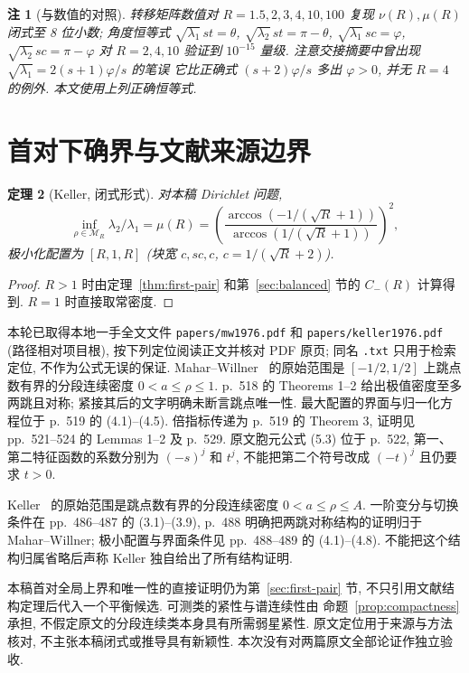 \documentclass[UTF8]{ctexart}
\newtheorem{theorem}{定理}[section]
\newtheorem{remark}[theorem]{注}
\begin{document}
\begin{remark}[与数值的对照]
转移矩阵数值对 $R = 1.5, 2, 3, 4, 10, 100$ 复现 $\nu(R), \mu(R)$ 闭式至 8 位小数;
角度恒等式 $\sqrt{\lambda_1}\,st = \theta$, $\sqrt{\lambda_2}\,st = \pi-\theta$,
$\sqrt{\lambda_1}\,sc = \varphi$, $\sqrt{\lambda_2}\,sc = \pi-\varphi$ 对 $R = 2, 4, 10$
验证到 $10^{-15}$ 量级. 注意交接摘要中曾出现 $\sqrt{\lambda_1} = 2(s+1)\varphi/s$ 的笔误
它比正确式 $(s+2)\varphi/s$ 多出 $\varphi>0$, 并无 $R=4$ 的例外.
本文使用上列正确恒等式.
\end{remark}

\section{首对下确界与文献来源边界}

\begin{theorem}[Keller, 闭式形式]
对本稿 Dirichlet 问题,
\[
 \inf_{\rho\in\mathcal M_R}\lambda_2/\lambda_1=\mu(R)
 =\left(\frac{\arccos(-1/(\sqrt R+1))}{\arccos(1/(\sqrt R+1))}\right)^2,
\]
极小化配置为 $[R, 1, R]$ (块宽 $c, sc, c$, $c = 1/(\sqrt{R}+2)$).
\end{theorem}

\begin{proof}
$R>1$ 时由定理~\ref{thm:first-pair} 和第~\ref{sec:balanced} 节的 $C_-(R)$ 计算得到.
$R=1$ 时直接取常密度.
\end{proof}

本轮已取得本地一手全文文件 \texttt{papers/mw1976.pdf} 和
\texttt{papers/keller1976.pdf} (路径相对项目根), 按下列定位阅读正文并核对 PDF 原页;
同名 \texttt{.txt} 只用于检索定位, 不作为公式无误的保证.
Mahar--Willner~\cite[pp.~517--518, Sections 1--3]{mw} 的原始范围是
$[-1/2,1/2]$ 上跳点数有界的分段连续密度 $0<a\leq\rho\leq1$.
p.~518 的 Theorems 1--2 给出极值密度至多两跳且对称;
紧接其后的文字明确未断言跳点唯一性.
最大配置的界面与归一化方程位于 p.~519 的 (4.1)--(4.5).
倍指标传递为 p.~519 的 Theorem 3, 证明见 pp.~521--524 的 Lemmas 1--2
及 p.~529. 原文胞元公式 (5.3) 位于 p.~522, 第一、第二特征函数的系数分别为
$(-s)^j$ 和 $t^j$, 不能把第二个符号改成 $(-t)^j$ 且仍要求 $t>0$.

Keller~\cite[p.~485, (1.1)--(2.1)]{keller} 的原始范围是跳点数有界的分段连续密度
$0<a\leq\rho\leq A$. 一阶变分与切换条件在 pp.~486--487 的 (3.1)--(3.9),
p.~488 明确把两跳对称结构的证明归于 Mahar--Willner;
极小配置与界面条件见 pp.~488--489 的 (4.1)--(4.8).
不能把这个结构归属省略后声称 Keller 独自给出了所有结构证明.

本稿首对全局上界和唯一性的直接证明仍为第~\ref{sec:first-pair} 节,
不只引用文献结构定理后代入一个平衡候选. 可测类的紧性与谱连续性由
命题~\ref{prop:compactness} 承担, 不假定原文的分段连续类本身具有所需弱星紧性.
原文定位用于来源与方法核对, 不主张本稿闭式或推导具有新颖性.
本次没有对两篇原文全部论证作独立验收.
\end{document}
